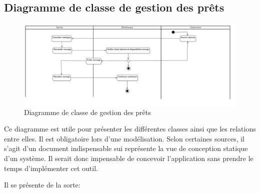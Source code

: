 \subsection{Diagramme de classe de gestion des prêts}
\paragraph{}
\begin{figure}[h]
        \centering
        \includegraphics[width=1\textwidth]{ActivityDiagram1}
        \caption{Diagramme de classe de gestion des prêts}
        \label{image-ActivityDiagram1}
        \end{figure}
\par
Ce diagramme est utile pour présenter les différentes classes ainsi que les relations 
entre elles. Il est obligatoire lors d'une modélisation. Selon certaines sources, il 
s'agit d'un document indispensable sui représente la vue de conception statique 
d'un système. Il serait donc impensable de concevoir l'application sans prendre le temps 
d'implémenter cet outil.
\par 
Il se présente de la sorte: \par 